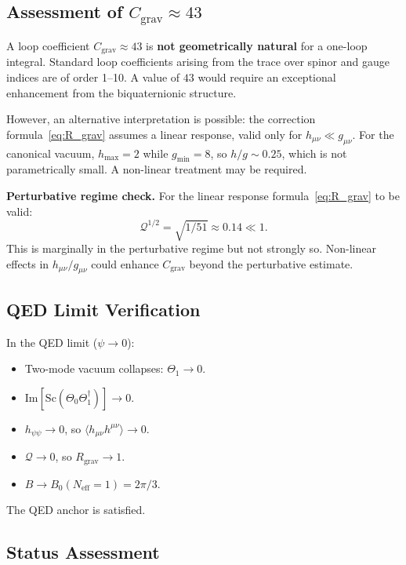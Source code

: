 \documentclass[11pt,a4paper]{article}
\theoremstyle{remark}
\begin{document}
\subsection{Assessment of \texorpdfstring{$C_{\mathrm{grav}} \approx 43$}{C\_grav ~ 43}}

A loop coefficient $C_{\mathrm{grav}} \approx 43$ is \textbf{not geometrically natural}
for a one-loop integral. Standard loop coefficients arising from the trace over spinor
and gauge indices are of order 1--10. A value of $43$ would require an exceptional
enhancement from the biquaternionic structure.

However, an alternative interpretation is possible: the correction formula~\eqref{eq:R_grav}
assumes a linear response, valid only for $h_{\mu\nu} \ll g_{\mu\nu}$. For the canonical vacuum,
$h_{\max} = 2$ while $g_{\min} = 8$, so $h/g \sim 0.25$, which is not parametrically small.
A non-linear treatment may be required.

\textbf{Perturbative regime check.}
For the linear response formula~\eqref{eq:R_grav} to be valid:
\begin{equation}
  \mathcal{Q}^{1/2} = \sqrt{1/51} \approx 0.14 \ll 1.
  \label{eq:perturbative_check}
\end{equation}
This is marginally in the perturbative regime but not strongly so. Non-linear effects in
$h_{\mu\nu}/g_{\mu\nu}$ could enhance $C_{\mathrm{grav}}$ beyond the perturbative estimate.

\subsection{QED Limit Verification}

In the QED limit ($\psi \to 0$):
\begin{itemize}
  \item Two-mode vacuum collapses: $\Theta_1 \to 0$.
  \item $\mathrm{Im}[\mathrm{Sc}(\Theta_0\Theta_1^\dagger)] \to 0$.
  \item $h_{\psi\psi} \to 0$, so $\langle h_{\mu\nu}h^{\mu\nu}\rangle \to 0$.
  \item $\mathcal{Q} \to 0$, so $R_{\mathrm{grav}} \to 1$.
  \item $B \to B_0(N_{\mathrm{eff}} = 1) = 2\pi/3$.
\end{itemize}
The QED anchor is satisfied. \checkmark

\subsection{Status Assessment}
\end{document}
